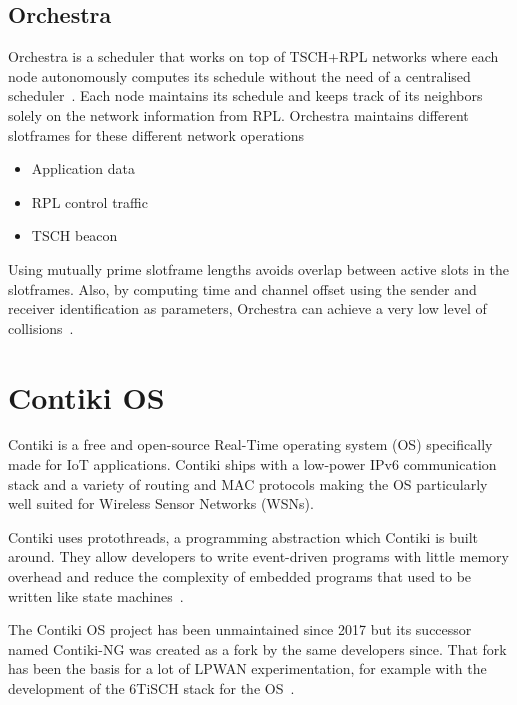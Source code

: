 \subsection{Orchestra}

Orchestra is a scheduler that works on top of TSCH+RPL
networks where each node autonomously computes its schedule without the
need of a centralised scheduler~\cite{duquennoy2015}.
Each node maintains its schedule and keeps track of its neighbors solely
on the network information from RPL.
Orchestra maintains different slotframes for these different network operations

\begin{itemize}
  \item Application data
  \item RPL control traffic
  \item TSCH beacon
\end{itemize}

Using mutually prime slotframe lengths avoids overlap between active slots in
the slotframes.
Also, by computing time and channel offset using the sender and receiver
identification as parameters, Orchestra can achieve a very low level of
collisions~\cite{duquennoy2015}.

\section{Contiki OS}

Contiki is a free and open-source Real-Time operating system (OS) specifically made
for IoT applications. Contiki ships with a low-power IPv6 communication stack
and a variety of routing and MAC protocols making the OS particularly well
suited for Wireless Sensor Networks (WSNs).

Contiki uses protothreads, a programming abstraction which Contiki is
built around.
They allow developers to write event-driven programs with little memory overhead and
reduce the complexity of embedded programs that used to be written
like state machines~\cite{10.1145/1182807.1182811}.

The Contiki OS project has been unmaintained since 2017 but its
successor named Contiki-NG was created as a fork by the same developers since.
That fork has been the basis for a lot of LPWAN experimentation, for example
with the development of the 6TiSCH stack for the OS~\cite{Duquennoy2017TSCHA6}.

\paragraph{}

